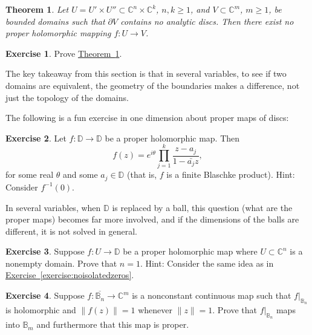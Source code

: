 \documentclass[12pt,openany]{book}
\newcommand{\snorm}[1]{\lVert {#1} \rVert}
\newcommand{\C}{{\mathbb{C}}}
\newcommand{\D}{{\mathbb{D}}}
\newcommand{\bB}{{\mathbb{B}}}
\theoremstyle{plain}
\newtheorem{thm}{Theorem}[section]
\theoremstyle{remark}
\theoremstyle{definition}
\newenvironment{exbox}{%
    \def\FrameCommand{\vrule width 1pt \relax\hspace{10pt}}%
    \MakeFramed {\advance \hsize -\width \FrameRestore}%
}{%
    \endMakeFramed
}
\theoremstyle{exercise}
\newtheorem{exercise}{Exercise}[section]
\theoremstyle{example}
\newcommand{\exerciseref}[1]{\hyperref[#1]{Exercise~\ref*{#1}}}
\newcommand{\thmref}[1]{\hyperref[#1]{Theorem~\ref*{#1}}}
\begin{document}
\begin{thm} \label{thm:nopropmapprodandnodisc}
Let $U = U' \times U'' \subset \C^n \times \C^k$, $n,k \geq 1$, and $V
\subset \C^m$, $m \geq 1$, be bounded
domains such that $\partial V$ contains no analytic discs.
Then there exist no proper
holomorphic mapping $f \colon U \to V$.
\end{thm}

\begin{exbox}
\begin{exercise}
Prove \thmref{thm:nopropmapprodandnodisc}.
\end{exercise}
\end{exbox}

The key takeaway from this section is that
in several variables, to see if two domains are equivalent,
the geometry 
of the boundaries makes a difference, not just the topology
of the domains.

\medskip

The following is a fun exercise in one dimension about proper maps of discs:

\begin{exbox}
\begin{exercise}
Let $f \colon \D \to \D$ be a proper holomorphic  map.  Then
\begin{equation*}
f(z) = 
e^{i\theta} \prod_{j=1}^k \frac{z-a_j}{1-\bar{a_j} z} ,
\end{equation*}
for some real $\theta$ and some $a_j \in \D$ (that is, $f$ is a finite
Blaschke product).  Hint: Consider $f^{-1}(0)$.
\end{exercise}
\end{exbox}

In several variables, when $\D$ is replaced by a ball,
this question (what are the proper maps)
becomes far more involved, and if the dimensions of the balls are
different, it is not solved in general.

\begin{exbox}
\begin{exercise}
Suppose $f \colon U \to \D$ be a proper holomorphic map where $U \subset
\C^n$ is a nonempty domain.  Prove that $n=1$.  Hint: Consider the same idea as in
\exerciseref{exercise:noisolatedzeros}.
\end{exercise}

\begin{exercise}
Suppose $f \colon \overline{\bB_n} \to \C^m$ is a nonconstant continuous
map such that $f|_{\bB_n}$ is holomorphic and $\snorm{f(z)} = 1$ whenever
$\snorm{z}=1$.  Prove that 
$f|_{\bB_n}$ maps into $\bB_m$ and furthermore that this map is proper.
\end{exercise}
\end{exbox}
\end{document}
